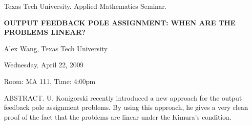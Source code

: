 \documentclass[oneside]{amsart}
\begin{document}
\begin{center}
Texas Tech University.  Applied Mathematics Seminar.

\end{center}

\begin{center}

{\LARGE \uppercase{\textbf{
Output Feedback Pole Assignment: When are the Problems Linear?
}}}

Alex Wang, Texas Tech University

Wednesday, April 22, 2009

Room: MA 111, Time: 4:00pm

\end{center}

ABSTRACT. U. Konigorski recently introduced a new approach for the output feedback pole assignment problems. By using this approach, he gives a very clean
proof of the fact that the problems are linear under the Kimura's condition.
\end{document}

